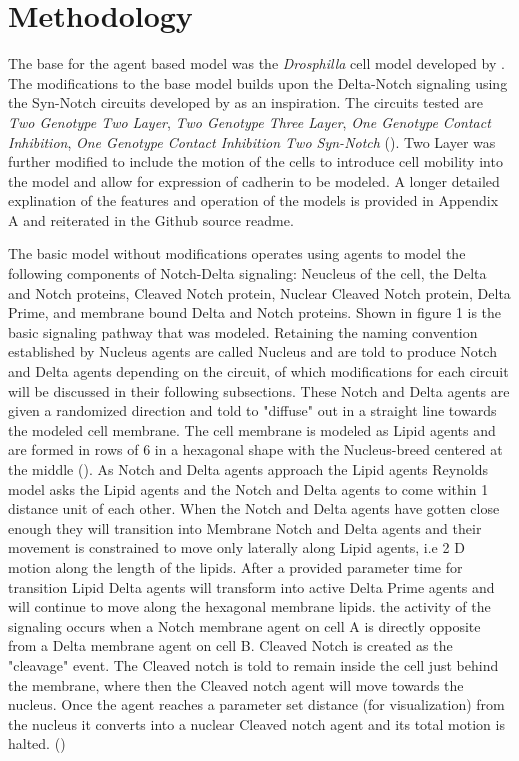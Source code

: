 \documentclass[12pt]{ifacconf}
\begin{document}




\section{Methodology}

The base for the agent based model was the \emph{Drosphilla} cell model developed by \cite{RAB:19}. The modifications to the base model builds upon the Delta-Notch signaling using the Syn-Notch circuits developed by \cite{TP:18} as an inspiration. The circuits tested are \emph{Two Genotype Two Layer}, \emph{Two Genotype Three Layer}, \emph{One Genotype Contact Inhibition}, \emph{One Genotype Contact Inhibition Two Syn-Notch} (\cite{TP:18}).  Two Layer was further modified to include the motion of the cells to introduce cell mobility into the model and allow for expression of cadherin to be modeled. A longer detailed explination of the features and operation of the models is provided in Appendix A and reiterated in the Github source readme. 

The basic model without modifications operates using agents to model the following components of Notch-Delta signaling: Neucleus of the cell, the Delta and Notch proteins, Cleaved Notch protein, Nuclear Cleaved Notch protein, Delta Prime, and membrane bound Delta and Notch proteins. Shown in figure 1 is the basic signaling pathway that was modeled. Retaining the naming convention established by \cite{RAB:19} Nucleus agents are called Nucleus and are told to produce Notch and Delta agents depending on the circuit, of which modifications for each circuit will be discussed in their following subsections. These Notch and Delta agents are given a randomized direction and told to "diffuse" out in a straight line towards the modeled cell membrane. The cell membrane is modeled as Lipid agents and are formed in rows of 6 in a hexagonal shape with the Nucleus-breed centered at the middle (\cite{RAB:19}). As Notch and Delta agents approach the Lipid agents Reynolds model asks the Lipid agents and the Notch and Delta agents to come within 1 distance unit of each other. When the Notch and Delta agents have gotten close enough they will transition into Membrane Notch and Delta agents and their movement is constrained to move only laterally along Lipid agents, i.e 2 D motion along the length of the lipids. After a provided parameter time for transition Lipid Delta agents will transform into active Delta Prime agents and will continue to move along the hexagonal membrane lipids. the activity of the signaling occurs when a Notch membrane agent on cell A is directly opposite from a Delta membrane agent on cell B. Cleaved Notch is created as the "cleavage" event. The Cleaved notch is told to remain inside the cell just behind the membrane, where then the Cleaved notch agent will move towards the nucleus. Once the agent reaches a parameter set distance (for visualization) from the nucleus it converts into a nuclear Cleaved notch agent and its total motion is halted. (\cite{RAB:19})
\end{document}
